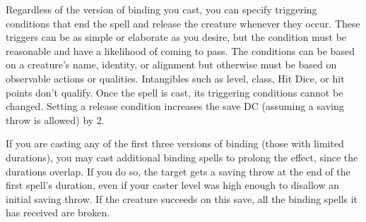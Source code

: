 Regardless of the version of binding you cast, 
you can specify triggering conditions that end the spell and release the creature whenever they occur. 
These triggers can be as simple or elaborate as you desire, but the condition must be reasonable and have a likelihood of coming to pass. 
The conditions can be based on a creature's name, identity, or alignment but otherwise must be based on observable actions or qualities. 
Intangibles such as level, class, Hit Dice, or hit points don't qualify. 
Once the spell is cast, its triggering conditions cannot be changed. 
Setting a release condition increases the save DC (assuming a saving throw is allowed) by 2.

If you are casting any of the first three versions of binding (those with limited durations), 
you may cast additional binding spells to prolong the effect, since the durations overlap. 
If you do so, the target gets a saving throw at the end of the first spell's duration, 
even if your caster level was high enough to disallow an initial saving throw. 
If the creature succeeds on this save, all the binding spells it has received are broken.

